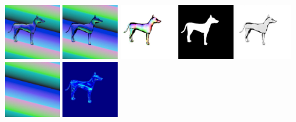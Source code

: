     \\
    \includegraphics[width=0.18\textwidth]{ch-tomnet/images/Synth/synthetic_1_dog__0000_gradient_7152_tar.jpg}
    \includegraphics[width=0.18\textwidth]{ch-tomnet/images/Synth/synthetic_1_dog__0000_gradient_7152_pred.jpg}
    \includegraphics[width=0.18\textwidth]{ch-tomnet/images/Synth/synthetic_1_dog__0000_gradient_7152_gt_fcolor.jpg}
    \includegraphics[width=0.18\textwidth]{ch-tomnet/images/Synth/synthetic_1_dog__0000_gradient_7152_gt_mask}
    \includegraphics[width=0.18\textwidth]{ch-tomnet/images/Synth/synthetic_1_dog__0000_gradient_7152_gt_rho}
    \\
    \includegraphics[width=0.18\textwidth]{ch-tomnet/images/Synth/synthetic_1_dog__0000_gradient_7152_ref.jpg}
    \includegraphics[width=0.18\textwidth]{ch-tomnet/images/Synth/synthetic_1_dog__0000_gradient_7152_diff.jpg}
